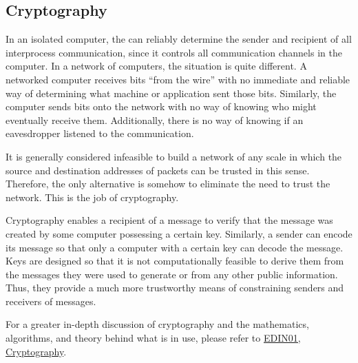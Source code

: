 \subsection{Cryptography}\label{subsec:Cryptography}
In an isolated computer, the  can reliably determine the sender and recipient of all interprocess communication, since it controls all communication channels in the computer.
In a network of computers, the situation is quite different.
A networked computer receives bits ``from the wire'' with no immediate and reliable way of determining what machine or application sent those bits.
Similarly, the computer sends bits onto the network with no way of knowing who might eventually receive them.
Additionally, there is no way of knowing if an eavesdropper listened to the communication.

It is generally considered infeasible to build a network of any scale in which the source and destination addresses of packets can be trusted in this sense.
Therefore, the only alternative is somehow to eliminate the need to trust the network.
This is the job of cryptography.

Cryptography enables a recipient of a message to verify that the message was created by some computer possessing a certain key.
Similarly, a sender can encode its message so that only a computer with a certain key can decode the message.
Keys are designed so that it is not computationally feasible to derive them from the messages they were used to generate or from any other public information.
Thus, they provide a much more trustworthy means of constraining senders and receivers of messages.

\begin{blackbox}
  For a greater in-depth discussion of cryptography and the mathematics, algorithms, and theory behind what is in use, please refer to \href{file:./EDIN01-Cryptography-Reference_Sheet.pdf}{EDIN01, Cryptography}.
\end{blackbox}


